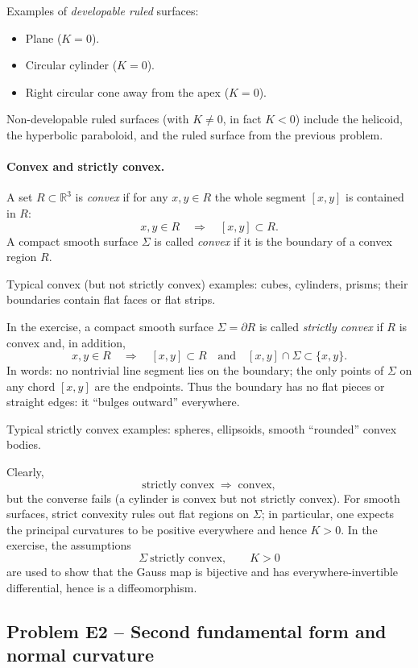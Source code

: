 \documentclass[12pt,a4paper]{article}
\theoremstyle{plain}
\theoremstyle{definition}      %
\begin{document}
	Examples of \emph{developable ruled} surfaces:
	\begin{itemize}
		\item Plane ($K=0$).
		\item Circular cylinder ($K=0$).
		\item Right circular cone away from the apex ($K=0$).
	\end{itemize}

Non-developable ruled surfaces (with $K\neq 0$, in fact $K<0$)
	include the helicoid, the hyperbolic paraboloid, and the ruled surface
	from the previous problem.
	
	\bigskip
	\paragraph{Convex and strictly convex.}
	A set $R\subset\mathbb{R}^3$ is \emph{convex} if for any $x,y\in R$ the whole
	segment $[x,y]$ is contained in $R$:
	\[
	x,y\in R \quad\Rightarrow\quad [x,y]\subset R.
	\]
	A compact smooth surface $\Sigma$ is called \emph{convex} if it is the boundary
	of a convex region $R$.
	
	Typical convex (but not strictly convex) examples: cubes, cylinders, prisms;
	their boundaries contain flat faces or flat strips.
	
	\medskip
	In the exercise, a compact smooth surface $\Sigma=\partial R$ is called
	\emph{strictly convex} if $R$ is convex and, in addition,
	\[
	x,y\in R \quad\Rightarrow\quad [x,y]\subset R
	\quad\text{and}\quad [x,y]\cap\Sigma\subset\{x,y\}.
	\]
	In words: no nontrivial line segment lies on the boundary; the only points of
	$\Sigma$ on any chord $[x,y]$ are the endpoints.  Thus the boundary has no flat
	pieces or straight edges: it ``bulges outward'' everywhere.
	
	Typical strictly convex examples: spheres, ellipsoids, smooth ``rounded''
	convex bodies.
	
	\medskip
	Clearly,
	\[
	\text{strictly convex} \;\Longrightarrow\; \text{convex},
	\]
	but the converse fails (a cylinder is convex but not strictly convex).  For
	smooth surfaces, strict convexity rules out flat regions on $\Sigma$; in
	particular, one expects the principal curvatures to be positive everywhere and
	hence $K>0$.  In the exercise, the assumptions
	\[
	\Sigma\ \text{strictly convex}, \qquad K>0
	\]
	are used to show that the Gauss map is bijective and has everywhere-invertible
	differential, hence is a diffeomorphism.
	
	
	\subsection*{Problem E2 – Second fundamental form and normal curvature}
	
\end{document}
